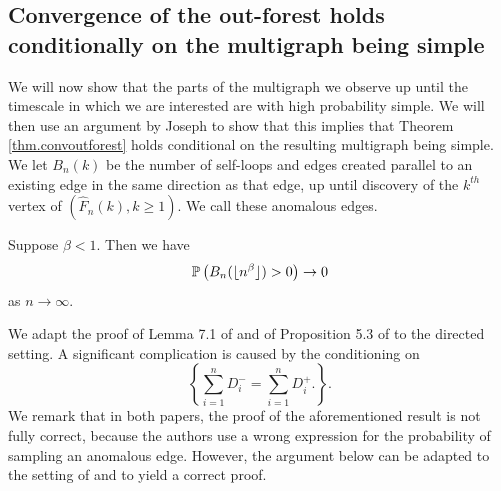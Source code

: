 \subsection{Convergence of the out-forest holds conditionally on the multigraph being simple}
We will now show that the parts of the multigraph we observe up until the timescale in which we are interested are with high probability simple. We will then use an argument by Joseph \cite{josephComponentSizesCritical2014} to show that this implies that Theorem \ref{thm.convoutforest} holds conditional on the resulting multigraph being simple. We let $B_n(k)$ be the number of self-loops and edges created parallel to an existing edge in the same direction as that edge, up until discovery of the $k^{th}$ vertex of $(\hat{F}_n(k),k\geq 1)$. We call these anomalous edges. 
\begin{proposition}\label{prop.anomalousedges}
Suppose $\beta<1$. Then we have
$$\P\left(B_n(\lfloor n^\beta \rfloor)>0\right)\to 0$$
as $n\to \infty$.
\end{proposition}
\begin{remark}
We adapt the proof of Lemma 7.1 of \cite{josephComponentSizesCritical2014} and of Proposition 5.3 of \cite{conchon--kerjanStableGraphMetric2020} to the directed setting. A significant complication is caused by the conditioning on $$\left\{\sum_{i=1}^n D^-_i=\sum_{i=1}^n D^+_i.\right\}.$$ We remark that in both papers, the proof of the aforementioned result is not fully correct, because the authors use a wrong expression for the probability of sampling an anomalous edge. However, the argument below can be adapted to the setting of \cite{josephComponentSizesCritical2014} and \cite{conchon--kerjanStableGraphMetric2020} to yield a correct proof.
\end{remark}
